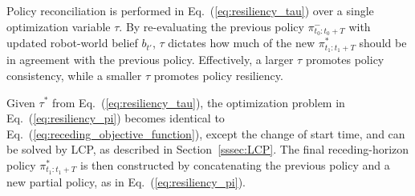 \documentclass[letterpaper]{article} %
\newcommand{\argmax}{\mathop{\mathrm{argmax}}}
\begin{document}
\normalsize
%
%
\noindent
Policy reconciliation is performed in Eq.~(\ref{eq:resiliency_tau}) 
over a single optimization variable $\tau$. By re-evaluating the previous policy $\pi_{t_0:t_0+T}^-$ with updated robot-world belief $b_{t'}$, $\tau$ dictates how much of the new $\pi_{t_1:t_1+T}^*$ should be in agreement with the previous policy. 
Effectively, a larger $\tau$ promotes policy consistency, while a smaller $\tau$ promotes policy resiliency.

Given $\tau^*$ from Eq.~(\ref{eq:resiliency_tau}), the optimization problem in Eq.~(\ref{eq:resiliency_pi}) becomes identical to Eq.~(\ref{eq:receding_objective_function}), except the change of start time,
and can be solved by LCP, as described in Section~\ref{sssec:LCP}.  %
%
The final receding-horizon policy $\pi_{t_1:t_1+T}^*$ is then constructed by concatenating the previous policy and a new partial policy, as in Eq.~(\ref{eq:resiliency_pi}).
\end{document}
